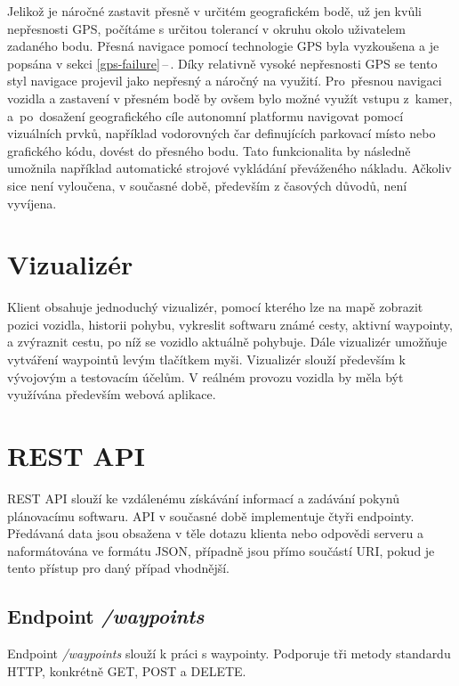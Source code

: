\documentclass[czech, bachelor]{diploma}
\newcommand{\filipref}[1]{\ref{#1}\,--\,\nameref{#1}}
\begin{document}
Jelikož je náročné zastavit přesně v určitém geografickém bodě, už jen kvůli nepřesnosti GPS, počítáme s určitou tolerancí
v okruhu okolo uživatelem zadaného bodu. Přesná navigace pomocí technologie GPS byla vyzkoušena a je popsána v sekci
\filipref{gps-failure}. Díky relativně vysoké nepřesnosti GPS se tento styl navigace projevil jako nepřesný a náročný na využití.
Pro~přesnou navigaci vozidla a zastavení v přesném bodě by ovšem bylo možné využít vstupu z~kamer, a~po~dosažení geografického
cíle autonomní platformu navigovat pomocí vizuálních prvků, například vodorovných čar definujících parkovací místo nebo
grafického kódu, dovést do přesného bodu. Tato funkcionalita by následně umožnila například automatické strojové vykládání
převáženého nákladu. Ačkoliv sice není vyloučena, v současné době, především z časových důvodů, není vyvíjena.

\section{Vizualizér} \label{visualizer}

Klient obsahuje jednoduchý vizualizér, pomocí kterého lze na mapě zobrazit pozici vozidla, historii pohybu, vykreslit
softwaru známé cesty, aktivní waypointy, a zvýraznit cestu, po níž se vozidlo aktuálně pohybuje. Dále vizualizér umožňuje
vytváření waypointů levým tlačítkem myši. Vizualizér slouží především k vývojovým a testovacím účelům. V reálném provozu vozidla
by měla být využívána především webová aplikace.

\section{REST API} \label{rest-api}

REST API slouží ke vzdálenému získávání informací a zadávání pokynů plánovacímu softwaru. API v současné době implementuje čtyři
endpointy. Předávaná data jsou obsažena v těle dotazu klienta nebo odpovědi serveru a naformátována ve formátu JSON, případně jsou
přímo součástí URI, pokud je tento přístup pro daný případ vhodnější.

\subsection{Endpoint \emph{/waypoints}}

Endpoint \emph{/waypoints} slouží k práci s waypointy. Podporuje tři metody standardu HTTP, konkrétně GET, POST a DELETE.
\end{document}
